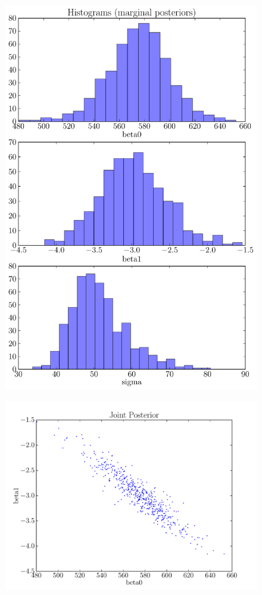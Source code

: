 \begin{figure}[ht!]
\begin{center}
\includegraphics[scale=0.5]{Figures/road_hist.pdf}
\end{center}
\end{figure}

\begin{figure}[ht!]
\begin{center}
\includegraphics[scale=0.5]{Figures/road_joint.pdf}
\end{center}
\end{figure}


